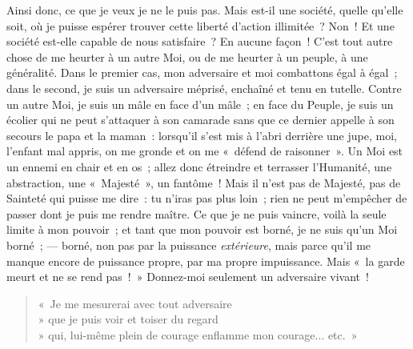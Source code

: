 \documentclass[french,twoside]{book} %
\begin{document}
 Ainsi donc, ce que je veux je ne le puis pas. Mais est-il une société, quelle qu’elle soit, où je puisse espérer trouver cette liberté d’action illimitée ? Non ! Et une société est-elle capable de nous satisfaire ? En aucune façon ! C’est tout autre chose de me heurter à un autre Moi, ou de me heurter à un peuple, à une généralité. Dans le premier cas, mon adversaire et moi combattons égal à égal ; dans le second, je suis un adversaire méprisé, enchaîné et tenu en tutelle. Contre un autre Moi, je suis un mâle en face d’un mâle ; en face du Peuple, je suis un écolier qui ne peut s’attaquer à son camarade sans que ce dernier appelle à son secours le papa et la maman : lorsqu’il s’est mis à l’abri derrière une jupe, moi, l’enfant mal appris, on me gronde et on me « défend de raisonner ». Un Moi est un ennemi en chair et en os ; allez donc étreindre et terrasser l’Humanité, une abstraction, une « Majesté », un fantôme ! Mais il n’est pas de Majesté, pas de Sainteté qui puisse me dire : tu n’iras pas plus loin ; rien ne peut m’empêcher de passer dont je puis me rendre maître. Ce que je ne puis vaincre, voilà la seule limite à mon pouvoir ; et tant que mon pouvoir est borné, je ne suis qu’un Moi borné ; — borné, non pas par la puissance \emph{extérieure}, mais parce qu’il me manque encore de puissance propre, par ma propre impuissance. Mais « la garde meurt et ne se rend pas ! » Donnez-moi seulement un adversaire vivant !\par


\begin{verse}
« Je me mesurerai avec tout adversaire\\
» que je puis voir et toiser du regard\\
» qui, lui-même plein de courage enflamme mon courage... etc. »\\
\end{verse}
\end{document}
